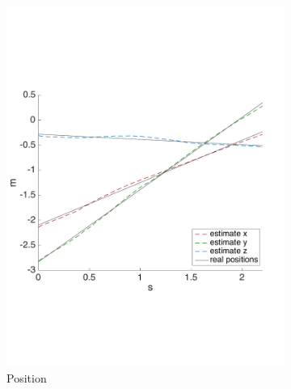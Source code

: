 \begin{figure}[!htbp]
\begin{subfigure}[b]{0.45\textwidth}
        \includegraphics[width=\textwidth]{img/tag_moving_real_world_pos2.pdf}
        \caption{Position}
        \label{fig:one_ekf_real_world_moving2}
   \end{subfigure}\hfill
   \begin{subfigure}[b]{0.45\textwidth}

\end{subfigure}
\end{figure}
